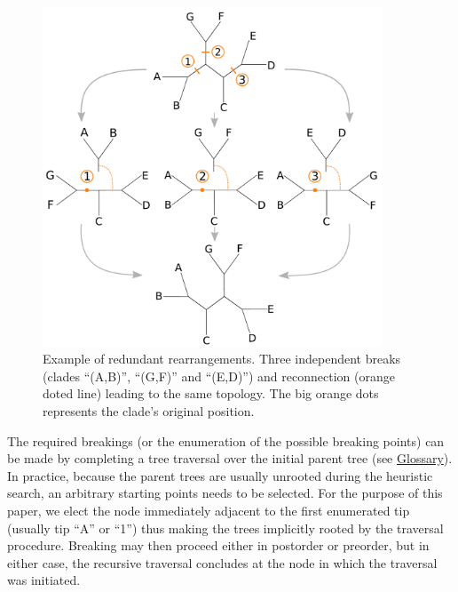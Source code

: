 \documentclass[12pt,letterpaper]{article}
\begin{document}
\begin{figure}[!htbp]
\centering
   \includegraphics[width=0.9\textwidth]{Figure/Figure_Redundantswaps.pdf}
\caption{Example of redundant rearrangements. Three independent breaks (clades ``(A,B)'', ``(G,F)'' and ``(E,D)'') and reconnection (orange doted line) leading to the same topology. The big orange dots represents the clade's original position.}
\label{Figure_redundant}
\end{figure}


The required breakings (or the enumeration of the possible breaking points) can be made by completing a tree traversal over the initial parent tree (see \hyperref[Glossary]{Glossary}).
In practice, because the parent trees are usually unrooted during the heuristic search, an arbitrary starting points needs to be selected.
For the purpose of this paper, we elect the node immediately adjacent to the first enumerated tip (usually tip ``A'' or ``1'') thus making the trees implicitly rooted by the traversal procedure.
Breaking may then proceed either in postorder or preorder, but in either case, the recursive traversal concludes at the node in which the traversal was initiated.
\end{document}
